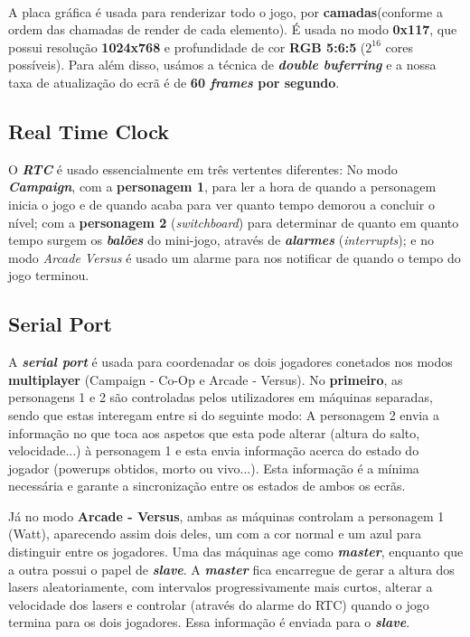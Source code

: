 \documentclass{report}
\begin{document}
\paragraph{}
A placa gráfica é usada para renderizar todo o jogo, por \textbf{camadas}(conforme a ordem das chamadas de render de cada elemento). É usada no modo \textbf{0x117}, que possui resolução \textbf{1024x768} e profundidade de cor \textbf{RGB 5:6:5} ($2^{16}$ cores possíveis).
Para além disso, usámos a técnica de \textbf{\textit{double buferring}} e a nossa taxa de atualização do ecrã é de \textbf{60 \textit{frames} por segundo}.

\subsection{Real Time Clock}

O \textbf{\textit{RTC}} é usado essencialmente em três vertentes diferentes: No modo \textbf{\textit{Campaign}}, com a \textbf{personagem 1}, para ler a hora de quando a personagem inicia o jogo e de quando acaba para ver quanto tempo demorou a concluir o nível; com a \textbf{personagem 2} (\textit{switchboard}) para determinar de quanto em quanto tempo surgem os \textbf{\textit{balões}} do mini-jogo, através de \textbf{\textit{alarmes}} (\textit{interrupts}); e no modo \textit{Arcade Versus} é usado um alarme para nos notificar de quando o tempo do jogo terminou.

\subsection{Serial Port}

A \textbf{\textit{serial port}} é usada para coordenadar os dois jogadores conetados nos modos \textbf{multiplayer} (Campaign - Co-Op e Arcade - Versus). No \textbf{primeiro}, as personagens 1 e 2 são controladas pelos utilizadores em máquinas separadas, sendo que estas interegam entre si do seguinte modo: A personagem 2 envia a informação no que toca aos aspetos que esta pode alterar (altura do salto, velocidade...) à personagem 1 e esta envia informação acerca do estado do jogador (powerups obtidos, morto ou vivo...). Esta informação é a mínima necessária e garante a sincronização entre os estados de ambos os ecrãs.

Já no modo \textbf{Arcade - Versus}, ambas as máquinas controlam a personagem 1 (Watt), aparecendo assim dois deles, um com a cor normal e um azul para distinguir entre os jogadores. Uma das máquinas age como \textbf{\textit{master}}, enquanto que a outra possui o papel de \textbf{\textit{slave}}. A \textbf{\textit{master}} fica encarregue de gerar a altura dos lasers aleatoriamente, com intervalos progressivamente mais curtos, alterar a velocidade dos lasers e controlar (através do alarme do RTC) quando o jogo termina para os dois jogadores. Essa informação é enviada para o \textbf{\textit{slave}}. 
\end{document}
